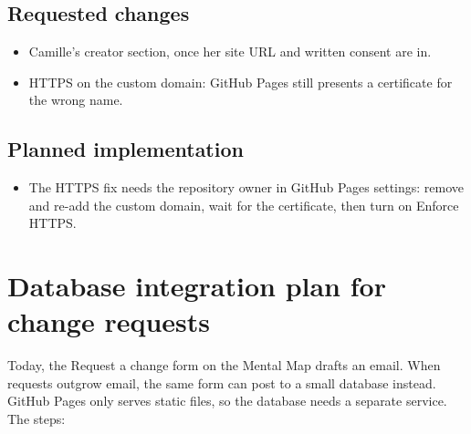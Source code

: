 \documentclass[11pt]{article}
\begin{document}
\subsection{Requested changes}
\begin{itemize}
\item Camille's creator section, once her site URL and written consent are in.
\item HTTPS on the custom domain: GitHub Pages still presents a certificate for the wrong name.
\end{itemize}
\subsection{Planned implementation}
\begin{itemize}
\item The HTTPS fix needs the repository owner in GitHub Pages settings: remove and re-add the custom domain, wait for the certificate, then turn on Enforce HTTPS.
\end{itemize}

\section{Database integration plan for change requests}
\label{database-plan}
Today, the Request a change form on the Mental Map drafts an email. When requests outgrow email, the same form can post to a small database instead. GitHub Pages only serves static files, so the database needs a separate service. The steps:
\end{document}
